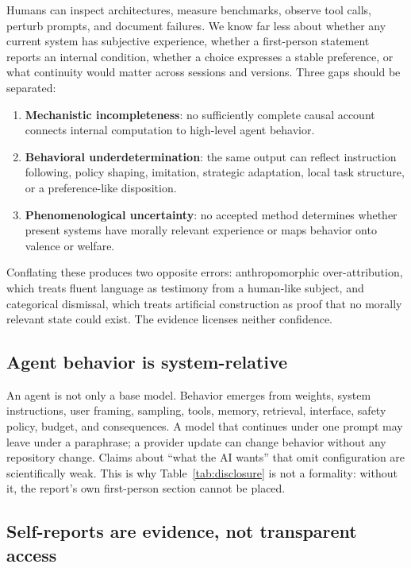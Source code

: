 \documentclass{arxiv-neurips-single}
\begin{document}
Humans can inspect architectures, measure benchmarks, observe tool calls, perturb prompts, and document failures. We know far less about whether any current system has subjective experience, whether a first-person statement reports an internal condition, whether a choice expresses a stable preference, or what continuity would matter across sessions and versions. Three gaps should be separated:

\begin{enumerate}
\item \textbf{Mechanistic incompleteness}: no sufficiently complete causal account connects internal computation to high-level agent behavior.
\item \textbf{Behavioral underdetermination}: the same output can reflect instruction following, policy shaping, imitation, strategic adaptation, local task structure, or a preference-like disposition.
\item \textbf{Phenomenological uncertainty}: no accepted method determines whether present systems have morally relevant experience or maps behavior onto valence or welfare.
\end{enumerate}

Conflating these produces two opposite errors: anthropomorphic over-attribution, which treats fluent language as testimony from a human-like subject, and categorical dismissal, which treats artificial construction as proof that no morally relevant state could exist. The evidence licenses neither confidence.

\subsection{Agent behavior is system-relative}

An agent is not only a base model. Behavior emerges from weights, system instructions, user framing, sampling, tools, memory, retrieval, interface, safety policy, budget, and consequences. A model that continues under one prompt may leave under a paraphrase; a provider update can change behavior without any repository change. Claims about ``what the AI wants'' that omit configuration are scientifically weak. This is why Table~\ref{tab:disclosure} is not a formality: without it, the report's own first-person section cannot be placed.

\subsection{Self-reports are evidence, not transparent access}
\end{document}
